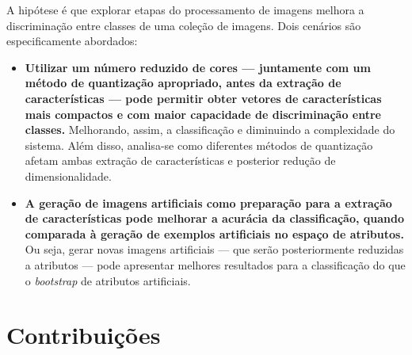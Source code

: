 A hipótese é que explorar etapas do processamento de imagens melhora a discriminação entre classes de uma coleção de imagens. Dois cenários são especificamente abordados:

\begin{itemize}

  \item \textbf{Utilizar um número reduzido de cores --- juntamente com um método de quantização apropriado, antes da extração de características --- pode permitir obter vetores de características mais compactos e com maior capacidade de discriminação entre classes.} Melhorando, assim, a classificação e diminuindo a complexidade do sistema. Além disso, analisa-se como diferentes métodos de quantização afetam ambas extração de características e posterior redução de dimensionalidade.

  \item \textbf{A geração de imagens artificiais como preparação para a extração de características pode melhorar a acurácia da classificação, quando comparada à geração de exemplos artificiais no espaço de atributos.} Ou seja, gerar novas imagens artificiais — que serão posteriormente reduzidas a atributos — pode apresentar melhores resultados para a classificação do que o \textit{bootstrap} de atributos artificiais.

\end{itemize}

\section{Contribuições}

